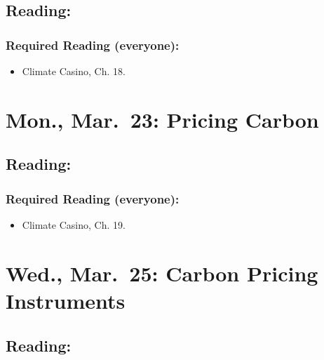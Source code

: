 \documentclass[
]{article}
\providecommand{\tightlist}{%
  \setlength{\itemsep}{0pt}\setlength{\parskip}{0pt}}
\begin{document}
\hypertarget{reading-28}{%
\subsection{Reading:}\label{reading-28}}

\hypertarget{required-reading-everyone-23}{%
\subsubsection{Required Reading
(everyone):}\label{required-reading-everyone-23}}

\begin{itemize}
\tightlist
\item
  Climate Casino, Ch. 18.
\end{itemize}

\hypertarget{mon.-mar.-23-pricing-carbon}{%
\section{Mon., Mar.~23: Pricing
Carbon}\label{mon.-mar.-23-pricing-carbon}}

\hypertarget{reading-29}{%
\subsection{Reading:}\label{reading-29}}

\hypertarget{required-reading-everyone-24}{%
\subsubsection{Required Reading
(everyone):}\label{required-reading-everyone-24}}

\begin{itemize}
\tightlist
\item
  Climate Casino, Ch. 19.
\end{itemize}

\hypertarget{wed.-mar.-25-carbon-pricing-instruments}{%
\section{Wed., Mar.~25: Carbon Pricing
Instruments}\label{wed.-mar.-25-carbon-pricing-instruments}}

\hypertarget{reading-30}{%
\subsection{Reading:}\label{reading-30}}
\end{document}
